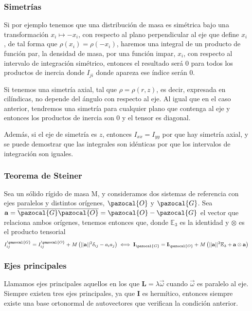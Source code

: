 \subsubsection{Simetrías}
Si por ejemplo tenemos que una distribución de masa es simétrica bajo una transformación $x_i \mapsto -x_i$, con respecto al plano perpendicular al eje que define $x_i$, de tal forma que $\rho(x_i) = \rho(-x_i)$, haremos una integral de un producto de función par, la densidad de masa, por una función impar, $x_i$, con respecto al intervalo de integración simétrico, entonces el resultado será 0 para todos los productos de inercia donde $I_{ji}$ donde apareza ese índice serán 0.

Si tenemos una simetría axial, tal que $\rho = \rho(r,z)$, es decir, expresada en cilíndicas, no depende del ángulo con respecto al eje. Al igual que en el caso anterior, tendremos una simetría para cualquier plano que contenga al eje y entonces los productos de inercia son 0 y el tensor es diagonal.

Además, si el eje de simetría es $z$, entonces $I_{xx} = I_{yy}$ por que hay simetría axial, y se puede demostrar que las integrales son idénticas por que los intervalos de integración son iguales.
\subsubsection{Teorema de Steiner}
Sea un sólido rígido de masa M, y consideramos dos sistemas de referencia con ejes paralelos y distintos orígenes, $\pazocal{O}$ y $\pazocal{G}$. Sea $\mathbf{a} = \overline{\pazocal{G}\pazocal{O}} = \pazocal{O}-\pazocal{G}$ el vector que relaciona ambos orígenes, tenemos entonces que, donde $\mathbb{E}_3$ es la identidad y $\otimes$ es el producto tensorial
\begin{equation} \label{6.1.1}
    I^\pazocal{G}_{ij} = I^\pazocal{O}_{ij} + M\left(||\mathbf{a}||^2 \delta_{ij} -a_i a_j\right) \iff \mathbf{I}_\pazocal{G} = \mathbf{I}_\pazocal{O} + M\left(||\mathbf{a}||^2 \mathbb{E}_3+\mathbf{a} \otimes \mathbf{a}\right)
\end{equation} 
\vspace{-20pt}
\subsubsection{Ejes principales}
Llamamos ejes principales aquellos en los que $\mathbf{L} = \lambda \vec{\omega}$ cuando $\vec{\omega}$ es paralelo al eje.
Siempre existen tres ejes principales, ya que $\mathbf{I}$ es hermítico, entonces siempre existe una base ortonormal de autovectores que verifican la condición anterior.
